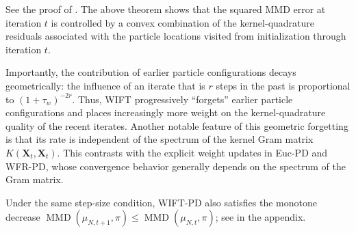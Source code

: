 See the proof of .
The above theorem shows that the squared MMD error at iteration $t$ is controlled by a convex combination of the kernel-quadrature residuals associated with the particle locations visited from initialization through iteration $t$.

Importantly, the contribution of earlier particle configurations decays geometrically: the influence of an iterate that is $r$ steps in the past is proportional to $(1+\tau_w)^{-2 r}$. Thus, WIFT progressively “forgets” earlier particle configurations and places increasingly more weight on the kernel-quadrature quality of the recent iterates. 
Another notable feature of this geometric forgetting is that its rate is independent of the spectrum of the kernel Gram matrix $K(\bm{X}_t,\bm{X}_t)$.
This contrasts with the explicit weight updates in Euc-PD and WFR-PD, whose convergence behavior generally depends on the spectrum of the Gram matrix.

Under the same step-size condition, WIFT-PD also satisfies the monotone decrease $\operatorname{MMD}(\mu_{N,t+1},\pi)\leq \operatorname{MMD}(\mu_{N,t},\pi)$; see  in the appendix.
